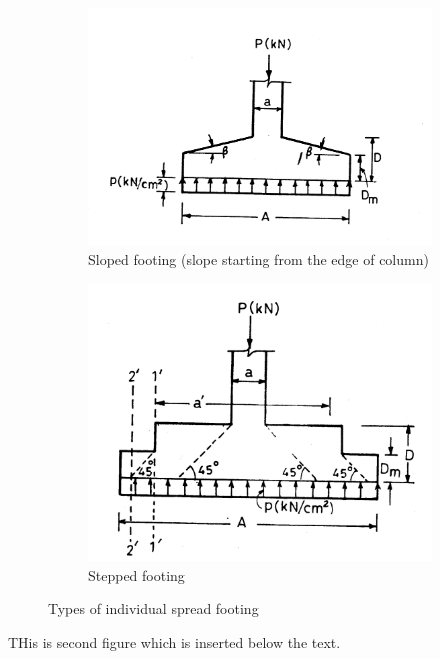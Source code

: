 \documentclass{report}
\begin{document}
\begin{figure}
\begin{subfigure}[b]{0.5\textwidth}
    \includegraphics[width=\textwidth]{images/fig2293.png}
    \caption{Sloped footing (slope starting from the edge of column)}
    \label{fig:2}
  \end{subfigure}
\begin{subfigure}[b]{0.5\textwidth}
    \includegraphics[width=\textwidth]{images/fig2294.png}
    \caption{Stepped footing}
    \label{fig:2}
  \end{subfigure}
\caption{Types of individual spread footing}
\end{figure}

THis is second figure which is inserted below the text.
\end{document}
